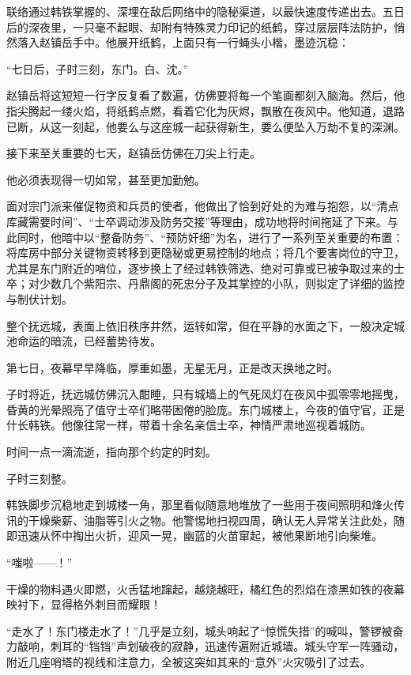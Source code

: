 联络通过韩铁掌握的、深埋在敌后网络中的隐秘渠道，以最快速度传递出去。五日后的深夜里，一只毫不起眼、却附有特殊灵力印记的纸鹤，穿过层层阵法防护，悄然落入赵镇岳手中。他展开纸鹤，上面只有一行蝇头小楷，墨迹沉稳：

“七日后，子时三刻，东门。白、沈。”

赵镇岳将这短短一行字反复看了数遍，仿佛要将每一个笔画都刻入脑海。然后，他指尖腾起一缕火焰，将纸鹤点燃，看着它化为灰烬，飘散在夜风中。他知道，退路已断，从这一刻起，他要么与这座城一起获得新生，要么便坠入万劫不复的深渊。

\vspace{2em}

接下来至关重要的七天，赵镇岳仿佛在刀尖上行走。

他必须表现得一切如常，甚至更加勤勉。

面对宗门派来催促物资和兵员的使者，他做出了恰到好处的为难与抱怨，以“清点库藏需要时间”、“士卒调动涉及防务交接”等理由，成功地将时间拖延了下来。与此同时，他暗中以“整备防务”、“预防奸细”为名，进行了一系列至关重要的布置：将库房中部分关键物资转移到更隐秘或更易控制的地点；将几个要害岗位的守卫，尤其是东门附近的哨位，逐步换上了经过韩铁筛选、绝对可靠或已被争取过来的士卒；对少数几个紫阳宗、丹鼎阁的死忠分子及其掌控的小队，则拟定了详细的监控与制伏计划。

整个抚远城，表面上依旧秩序井然，运转如常，但在平静的水面之下，一股决定城池命运的暗流，已经蓄势待发。

\vspace{2em}

第七日，夜幕早早降临，厚重如墨，无星无月，正是改天换地之时。

子时将近，抚远城仿佛沉入酣睡，只有城墙上的气死风灯在夜风中孤零零地摇曳，昏黄的光晕照亮了值守士卒们略带困倦的脸庞。东门城楼上，今夜的值守官，正是什长韩铁。他像往常一样，带着十余名亲信士卒，神情严肃地巡视着城防。

时间一点一滴流逝，指向那个约定的时刻。

子时三刻整。

韩铁脚步沉稳地走到城楼一角，那里看似随意地堆放了一些用于夜间照明和烽火传讯的干燥柴薪、油脂等引火之物。他警惕地扫视四周，确认无人异常关注此处，随即迅速从怀中掏出火折，迎风一晃，幽蓝的火苗窜起，被他果断地引向柴堆。

“嗤啦——！”

干燥的物料遇火即燃，火舌猛地蹿起，越烧越旺，橘红色的烈焰在漆黑如铁的夜幕映衬下，显得格外刺目而耀眼！

“走水了！东门楼走水了！”几乎是立刻，城头响起了“惊慌失措”的喊叫，警锣被奋力敲响，刺耳的“铛铛”声划破夜的寂静，迅速传遍附近城墙。城头守军一阵骚动，附近几座哨塔的视线和注意力，全被这突如其来的“意外”火灾吸引了过去。

